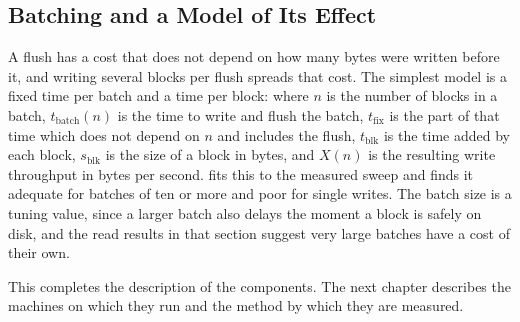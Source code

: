 \subsection{Batching and a Model of Its Effect}

A flush has a cost that does not depend on how many bytes were written before
it, and writing several blocks per flush spreads that cost. The simplest
 model is a fixed time per batch and a time per block:
where $n$ is the number of blocks in a batch, $t_{\text{batch}}(n)$ is the
time to write and flush the batch, $t_{\text{fix}}$ is the part of that time
which does not depend on $n$ and includes the flush, $t_{\text{blk}}$ is the
time added by each block, $s_{\text{blk}}$ is the size of a block in bytes,
and $X(n)$ is the resulting write throughput in bytes per second.
 fits this to the measured sweep and finds it adequate for
batches of ten or more and poor for single writes. The batch size is a tuning value, since a larger batch also delays
the moment a block is safely on disk, and the read results in that section
suggest very large batches have a cost of their own.

This completes the description of the components. The next chapter
describes the machines on which they run and the method by which they are
measured.
